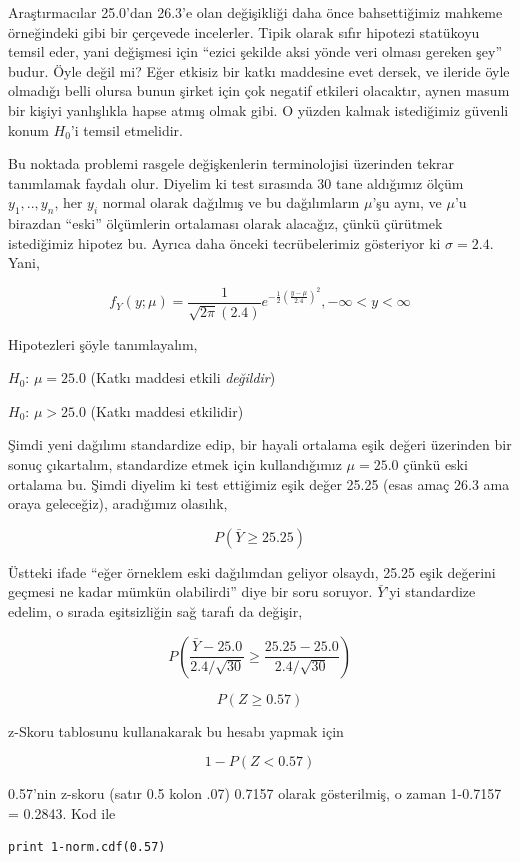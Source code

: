 \documentclass[12pt,fleqn]{article}\usepackage{../../common}
\begin{document}
Araştırmacılar 25.0'dan 26.3'e olan değişikliği daha önce bahsettiğimiz
mahkeme örneğindeki gibi bir çerçevede incelerler. Tipik olarak sıfır
hipotezi statükoyu temsil eder, yani değişmesi için ``ezici şekilde aksi
yönde veri olması gereken şey'' budur. Öyle değil mi? Eğer etkisiz bir
katkı maddesine evet dersek, ve ileride öyle olmadığı belli olursa bunun
şirket için çok negatif etkileri olacaktır, aynen masum bir kişiyi
yanlışlıkla hapse atmış olmak gibi. O yüzden kalmak istediğimiz güvenli
konum $H_0$'i temsil etmelidir. 

Bu noktada problemi rasgele değişkenlerin terminolojisi üzerinden tekrar
tanımlamak faydalı olur. Diyelim ki test sırasında 30 tane aldığımız ölçüm
$y_1,..,y_n$, her $y_i$ normal olarak dağılmış ve bu dağılımların $\mu$'şu
aynı, ve $\mu$'u birazdan ``eski'' ölçümlerin ortalaması olarak alacağız,
çünkü çürütmek istediğimiz hipotez bu. Ayrıca daha önceki tecrübelerimiz
gösteriyor ki $\sigma = 2.4$. Yani,

$$ 
f_Y(y;\mu) = \frac{1}{\sqrt{2\pi}(2.4)} 
e^{-\frac{1}{2}(\frac{y-\mu}{2.4})^2},
-\infty < y < \infty
$$

Hipotezleri şöyle tanımlayalım,

$H_0$: $\mu = 25.0$ (Katkı maddesi etkili {\em değildir})

$H_0$: $\mu > 25.0$ (Katkı maddesi etkilidir)

Şimdi yeni dağılımı standardize edip, bir hayali ortalama eşik değeri
üzerinden bir sonuç çıkartalım, standardize etmek için kullandığımız $\mu =
25.0$ çünkü eski ortalama bu. Şimdi diyelim ki test ettiğimiz eşik değer 25.25
(esas  amaç 26.3 ama oraya geleceğiz), aradığımız olasılık,

$$ P(\bar{Y}  \ge 25.25) $$

Üstteki ifade ``eğer örneklem eski dağılımdan geliyor olsaydı, 25.25
eşik değerini geçmesi ne kadar mümkün olabilirdi'' diye bir soru
soruyor. $\bar{Y}$'yi standardize edelim, o sırada eşitsizliğin sağ tarafı da
değişir,

$$ P(\frac{\bar{Y} - 25.0}{2.4 / \sqrt{30}} \ge 
\frac{25.25 - 25.0}{2.4 / \sqrt{30}}) 
$$


$$ P(Z \ge 0.57)$$

z-Skoru tablosunu kullanakarak bu hesabı yapmak için

$$ 1 - P(Z < 0.57)$$

0.57'nin z-skoru (satır 0.5 kolon .07) 0.7157 olarak gösterilmiş, o zaman
1-0.7157 = 0.2843. Kod ile

\begin{verbatim}
print 1-norm.cdf(0.57)
\end{verbatim}
\end{document}
